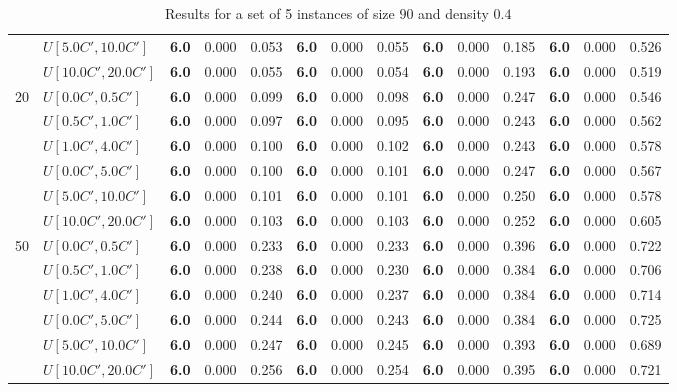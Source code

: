 \begin{table}[h]
{\begin{tabular}{|l|l||l|l|l||l|l|l||l|l|l||l|l|l|}
       & $U[5.0C',10.0C']$ & \textbf{6.0} & 0.000 & 0.053 & \textbf{6.0} & 0.000 & 0.055 & \textbf{6.0} & 0.000 & 0.185 & \textbf{6.0} & 0.000 & 0.526 \\
       & $U[10.0C',20.0C']$ & \textbf{6.0} & 0.000 & 0.055 & \textbf{6.0} & 0.000 & 0.054 & \textbf{6.0} & 0.000 & 0.193 & \textbf{6.0} & 0.000 & 0.519 \\
      \hline\hline
      \multirow{6}{*}{20} & $U[0.0C',0.5C']$ & \textbf{6.0} & 0.000 & 0.099 & \textbf{6.0} & 0.000 & 0.098 & \textbf{6.0} & 0.000 & 0.247 & \textbf{6.0} & 0.000 & 0.546 \\
       & $U[0.5C',1.0C']$ & \textbf{6.0} & 0.000 & 0.097 & \textbf{6.0} & 0.000 & 0.095 & \textbf{6.0} & 0.000 & 0.243 & \textbf{6.0} & 0.000 & 0.562 \\
       & $U[1.0C',4.0C']$ & \textbf{6.0} & 0.000 & 0.100 & \textbf{6.0} & 0.000 & 0.102 & \textbf{6.0} & 0.000 & 0.243 & \textbf{6.0} & 0.000 & 0.578 \\
       & $U[0.0C',5.0C']$ & \textbf{6.0} & 0.000 & 0.100 & \textbf{6.0} & 0.000 & 0.101 & \textbf{6.0} & 0.000 & 0.247 & \textbf{6.0} & 0.000 & 0.567 \\
       & $U[5.0C',10.0C']$ & \textbf{6.0} & 0.000 & 0.101 & \textbf{6.0} & 0.000 & 0.101 & \textbf{6.0} & 0.000 & 0.250 & \textbf{6.0} & 0.000 & 0.578 \\
       & $U[10.0C',20.0C']$ & \textbf{6.0} & 0.000 & 0.103 & \textbf{6.0} & 0.000 & 0.103 & \textbf{6.0} & 0.000 & 0.252 & \textbf{6.0} & 0.000 & 0.605 \\
      \hline\hline
      \multirow{6}{*}{50} & $U[0.0C',0.5C']$ & \textbf{6.0} & 0.000 & 0.233 & \textbf{6.0} & 0.000 & 0.233 & \textbf{6.0} & 0.000 & 0.396 & \textbf{6.0} & 0.000 & 0.722 \\
       & $U[0.5C',1.0C']$ & \textbf{6.0} & 0.000 & 0.238 & \textbf{6.0} & 0.000 & 0.230 & \textbf{6.0} & 0.000 & 0.384 & \textbf{6.0} & 0.000 & 0.706 \\
       & $U[1.0C',4.0C']$ & \textbf{6.0} & 0.000 & 0.240 & \textbf{6.0} & 0.000 & 0.237 & \textbf{6.0} & 0.000 & 0.384 & \textbf{6.0} & 0.000 & 0.714 \\
       & $U[0.0C',5.0C']$ & \textbf{6.0} & 0.000 & 0.244 & \textbf{6.0} & 0.000 & 0.243 & \textbf{6.0} & 0.000 & 0.384 & \textbf{6.0} & 0.000 & 0.725 \\
       & $U[5.0C',10.0C']$ & \textbf{6.0} & 0.000 & 0.247 & \textbf{6.0} & 0.000 & 0.245 & \textbf{6.0} & 0.000 & 0.393 & \textbf{6.0} & 0.000 & 0.689 \\
       & $U[10.0C',20.0C']$ & \textbf{6.0} & 0.000 & 0.256 & \textbf{6.0} & 0.000 & 0.254 & \textbf{6.0} & 0.000 & 0.395 & \textbf{6.0} & 0.000 & 0.721 \\
      \hline
      \end{tabular}
      }
      \caption{Results for a set of 5 instances of size $90$ and density $0.4$}
      \label{tab:pcpn90p4}\end{table}
      
